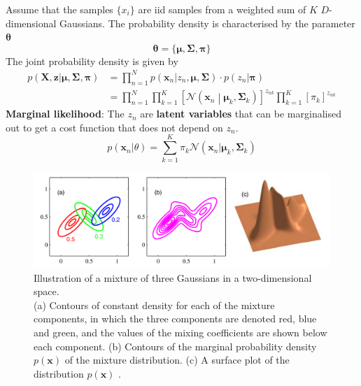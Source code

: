 \documentclass[11pt]{article}
\theoremstyle{definition}
\newcommand*\N[1]{\mathcal{N}\left(#1\right)}
\begin{document}
Assume that the samples $\{x_i\}$ are iid samples from a weighted sum of $K$ $D$-dimensional Gaussians. The probability density is characterised by the parameter $\bm{\theta}$
\begin{equation*}
	\bm{\theta} = \{\bm{\mu}, \bm{\Sigma}, \bm{\pi}\}
\end{equation*}
The joint probability density is given by
\begin{align*}
	p(\textbf{X},\textbf{z} | \bm{\mu}, \bm{\Sigma}, \bm{\pi}) &= \prod_{n=1}^{N} p(\textbf{x}_n|z_n,\bm{\mu}, \bm{\Sigma}) \cdot p(z_n|\bm{\pi})\\
	&= \prod_{n=1}^{N}\prod_{k=1}^{K} \left[ \N{\textbf{x}_n\middle|\bm{\mu}_k, \bm{\Sigma}_k} \right]^{z_{nk}} \prod_{k=1}^{K}[\pi_k]^{z_{nk}}
\end{align*}
\textbf{Marginal likelihood}: The $z_n$ are \textbf{latent variables} that can be marginalised out to get a cost function that does not depend on $z_n$.
\begin{equation*}
	p(\textbf{x}_n|\theta) = \sum_{k=1}^{K} \pi_k \N{\textbf{x}_n|\bm{\mu}_k, \bm{\Sigma}_k}
\end{equation*}
\begin{figure}[H]
	\centering
	\includegraphics[width=0.8\linewidth]{img/GMM05}
	\caption{Illustration of a mixture of three Gaussians in a two-dimensional space.\\
	(a) Contours of constant density for each of the mixture components, in which the three components are denoted red, blue and green, and the values of the mixing coefficients are shown below each component. (b) Contours of the marginal probability density $p(\textbf{x})$ of the mixture distribution. (c) A surface plot of the distribution  $p(\textbf{x})$ \parencite{bishop2006pattern}.}
	\label{fig:gmm05}
\end{figure}
\end{document}
